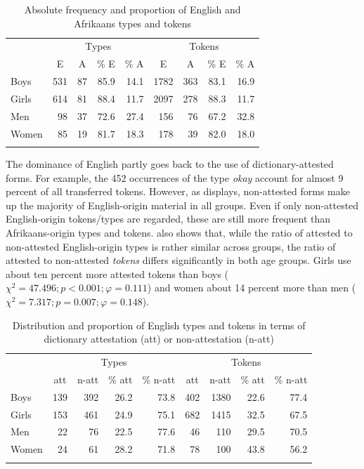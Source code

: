 \documentclass[output=paper]{langsci/langscibook}
\begin{document}
  
\begin{table}
\begin{tabular}{lrrrrrrrr}
\lsptoprule
& \multicolumn{4}{c}{Types} & \multicolumn{4}{c}{Tokens}\\\cmidrule(lr){2-5}\cmidrule(lr){6-9}
		& \multicolumn{1}{c}{E} & \multicolumn{1}{c}{A} & \multicolumn{1}{c}{\% E} & \multicolumn{1}{c}{\% A} & \multicolumn{1}{c}{E} & \multicolumn{1}{c}{A} & \multicolumn{1}{c}{\% E} & \multicolumn{1}{c}{\% A}\\
\midrule
Boys & 531 & 87 & 85.9 & 14.1 & 1782 & 363 & 83.1 & 16.9\\
Girls & 614 & 81 & 88.4 & 11.7 & 2097 & 278 & 88.3 & 11.7\\
Men & 98 & 37 & 72.6 & 27.4 & 156 & 76 & 67.2 & 32.8\\
Women & 85 & 19 & 81.7 & 18.3 & 178 & 39 & 82.0 & 18.0\\
\lspbottomrule
\end{tabular}
\caption{Absolute frequency and proportion of English and Afrikaans types and tokens\label{tab:bracke:7}}
\end{table}  

The dominance of English partly goes back to the use of dictionary-attested forms. For example, the 452 occurrences of the type \textit{okay} account for almost 9 percent of all transferred tokens. However, as  displays, non-attested forms make up the majority of English-origin material in all groups. Even if only non-attested English-origin tokens/types are regarded, these are still more frequent than Afrikaans-origin types and tokens.  also shows that, while the ratio of attested to non-attested English-origin types is rather similar across groups, the ratio of attested to non-attested \textit{tokens} differs significantly in both age groups. Girls use about ten percent more attested tokens than boys ($\chi^2 = 47.496; p < 0.001; \varphi = 0.111$) and women about 14 percent more than men ($\chi^2 = 7.317; p = 0.007; \varphi = 0.148$).

  
\begin{table}
\begin{tabular}{lrrrrrrrr}
\lsptoprule
& \multicolumn{4}{c}{Types} & \multicolumn{4}{c}{Tokens}\\\cmidrule(lr){2-5}\cmidrule(lr){6-9}
& \multicolumn{1}{c}{att} & \multicolumn{1}{c}{n-att} & \multicolumn{1}{c}{\% att} & \multicolumn{1}{c}{\% n-att} & \multicolumn{1}{c}{att} & \multicolumn{1}{c}{n-att} & \multicolumn{1}{c}{\% att} & \multicolumn{1}{c}{\% n-att}\\
\hline
Boys & 139 & 392 & 26.2 & 73.8 & 402 & 1380 & 22.6 & 77.4\\
Girls & 153 & 461 & 24.9 & 75.1 & 682 & 1415 & 32.5 & 67.5\\
Men & 22 & 76 & 22.5 & 77.6 & 46 & 110 & 29.5 & 70.5\\
Women & 24 & 61 & 28.2 & 71.8 & 78 & 100 & 43.8 & 56.2\\
\lspbottomrule
\end{tabular}
\caption{Distribution and proportion of English types and tokens in terms of dictionary attestation (att) or non-attestation (n-att)\label{tab:bracke:8}}
\end{table}  
\end{document}
